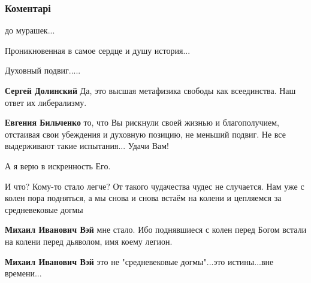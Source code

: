  
 
 
 
 
\subsubsection{Коментарі}
\label{sec:25_10_2021.fb.bilchenko_evgenia.1.russkij_podvig_kanyshev_aleksej.cmt}

\begin{itemize} %
до мурашек...

Проникновенная в самое сердце и душу история...

Духовный подвиг.....

\begin{itemize} %
\textbf{Сергей Долинский} Да, это высшая метафизика свободы как всеединства. Наш ответ их либерализму.

\textbf{Евгения Бильченко} то, что Вы рискнули своей жизнью и благополучием, отстаивая свои убеждения и духовную позицию, не меньший подвиг. Не все выдерживают такие испытания... Удачи Вам!
\end{itemize} %

А я верю в искренность Его.


И что? Кому-то стало легче? От такого чудачества чудес не случается. Нам уже с
колен пора подняться, а мы снова и снова встаём на колени и цепляемся за
средневековые догмы

\begin{itemize} %
\textbf{Михаил Иванович Вэй} мне стало. Ибо поднявшиеся с колен перед Богом встали на колени перед дьяволом, имя коему легион.

\textbf{Михаил Иванович Вэй} это не "средневековые догмы"...это истины...вне времени...
\end{itemize} %



\end{itemize}
